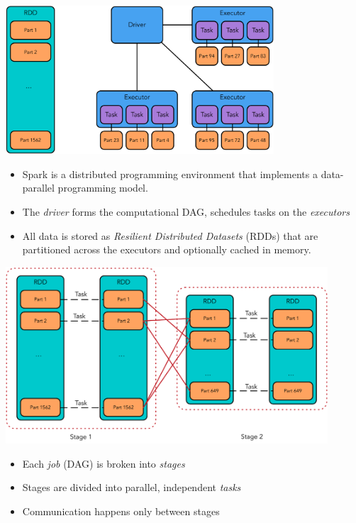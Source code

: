 \documentclass[xcolor=x11names,compress,ignorenonframetext,10pt]{beamer}
\renewcommand{\(}{\begin{columns}}
\renewcommand{\)}{\end{columns}}
\newcommand{\<}[1]{\begin{column}{#1}}
\renewcommand{\>}{\end{column}}
\begin{document}
\begin{frame}
  \begin{center}
  \includegraphics[width=0.75\textwidth]{figures/spark/spark-driver-rdd-architecture}
\end{center}
\begin{itemize}
  \item Spark is a distributed programming environment that implements a data-parallel programming model. 
  \item The \emph{driver} forms the computational DAG, schedules tasks on the \emph{executors}
  \item All data is stored as \emph{Resilient Distributed Datasets} (RDDs) that
    are partitioned across the executors and optionally cached in memory. 
\end{itemize}
\end{frame}

\begin{frame}
  \begin{center}
    \includegraphics[width=0.9\textwidth]{figures/spark/spark-staging}
  \end{center}
  \begin{itemize}
    \item Each \emph{job} (DAG) is broken into \emph{stages}
    \item Stages are divided into parallel, independent \emph{tasks}
    \item Communication happens only between stages
  \end{itemize}
\end{frame}
\end{document}
